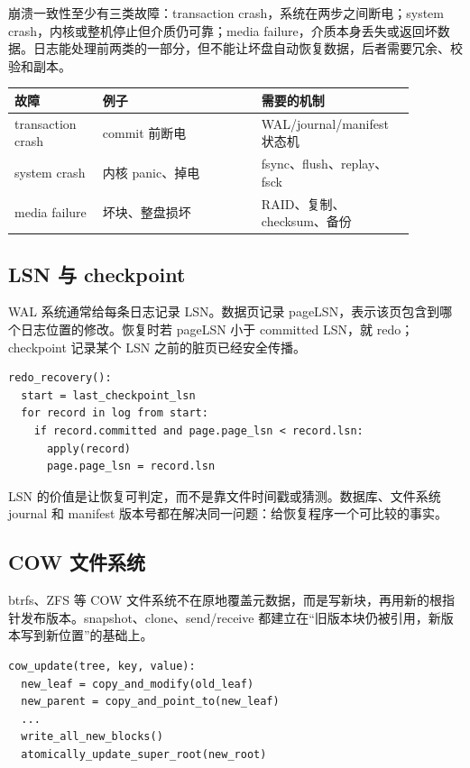 崩溃一致性至少有三类故障：transaction crash，系统在两步之间断电；system crash，内核或整机停止但介质仍可靠；media failure，介质本身丢失或返回坏数据。日志能处理前两类的一部分，但不能让坏盘自动恢复数据，后者需要冗余、校验和副本。

\begin{longtable}{p{0.2\linewidth}p{0.36\linewidth}p{0.32\linewidth}}
\toprule
故障 & 例子 & 需要的机制 \\
\midrule
transaction crash & commit 前断电 & WAL/journal/manifest 状态机 \\
system crash & 内核 panic、掉电 & fsync、flush、replay、fsck \\
media failure & 坏块、整盘损坏 & RAID、复制、checksum、备份 \\
\bottomrule
\end{longtable}

\subsection{LSN 与 checkpoint}

WAL 系统通常给每条日志记录 LSN。数据页记录 pageLSN，表示该页包含到哪个日志位置的修改。恢复时若 pageLSN 小于 committed LSN，就 redo；checkpoint 记录某个 LSN 之前的脏页已经安全传播。

\begin{lstlisting}
redo_recovery():
  start = last_checkpoint_lsn
  for record in log from start:
    if record.committed and page.page_lsn < record.lsn:
      apply(record)
      page.page_lsn = record.lsn
\end{lstlisting}

LSN 的价值是让恢复可判定，而不是靠文件时间戳或猜测。数据库、文件系统 journal 和 manifest 版本号都在解决同一问题：给恢复程序一个可比较的事实。

\subsection{COW 文件系统}

btrfs、ZFS 等 COW 文件系统不在原地覆盖元数据，而是写新块，再用新的根指针发布版本。snapshot、clone、send/receive 都建立在“旧版本块仍被引用，新版本写到新位置”的基础上。

\begin{lstlisting}
cow_update(tree, key, value):
  new_leaf = copy_and_modify(old_leaf)
  new_parent = copy_and_point_to(new_leaf)
  ...
  write_all_new_blocks()
  atomically_update_super_root(new_root)
\end{lstlisting}

